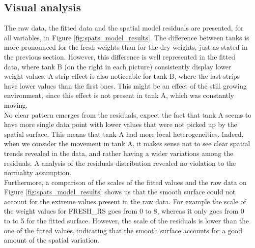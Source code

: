 \subsection{Visual analysis}
The raw data, the fitted data and the spatial model residuals are presented, for all variables, in Figure \ref{fig:spats_model_results}. The difference between tanks is more pronounced for the fresh weights than for the dry weights, just as stated in the previous section. However, this difference is well represented in the fitted data, where tank B (on the right in each picture) consistently display lower weight values. A strip effect is also noticeable for tank B, where the last strips have lower values than the first ones. This might be an effect of the still growing environment, since this effect is not present in tank A, which was constantly moving.\\

No clear pattern emerges from the residuals, expect the fact that tank A seems to have more single data point with lower values that were not picked up by the spatial surface. This means that tank A had more local heterogeneities. Indeed, when we consider the movement in tank A, it makes sense not to see clear spatial trends revealed in the data, and rather having a wider variations among the residuals. A analysis of the residuals distribution revealed no violation to the normality assumption.\\

Furthermore, a comparison of the scales of the fitted values and the raw data on Figure \ref{fig:spats_model_results} shows us that the smooth surface could not account for the extreme values present in the raw data. For example the scale of the weight values for FRESH\_RS goes from 0 to 8, whereas it only goes from 0 to to 5 for the fitted surface. However, the scale of the residuals is lower than the one of the fitted values, indicating that the smooth surface accounts for a good amount of the spatial variation.

